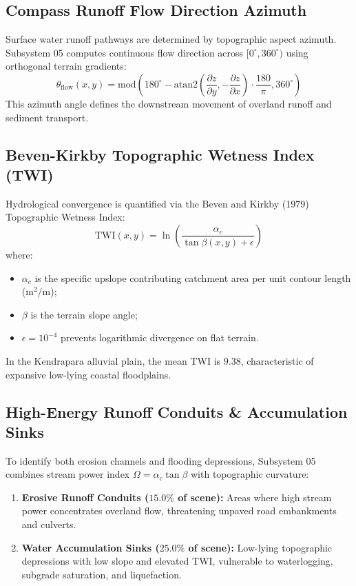 \documentclass[11pt,a4paper]{article}
\theoremstyle{definition}
\theoremstyle{remark}
\begin{document}
\subsection{Compass Runoff Flow Direction Azimuth}
Surface water runoff pathways are determined by topographic aspect azimuth. Subsystem 05 computes continuous flow direction across $[0^\circ, 360^\circ)$ using orthogonal terrain gradients:
\begin{equation}
    \theta_{\text{flow}}(x, y) = \text{mod}\left( 180^\circ - \text{atan2}\left( \frac{\partial z}{\partial y}, -\frac{\partial z}{\partial x} \right) \cdot \frac{180}{\pi}, 360^\circ \right)
\end{equation}
This azimuth angle defines the downstream movement of overland runoff and sediment transport.

\subsection{Beven-Kirkby Topographic Wetness Index (TWI)}
Hydrological convergence is quantified via the Beven and Kirkby (1979) Topographic Wetness Index:
\begin{equation}
    \text{TWI}(x, y) = \ln\left( \frac{\alpha_c}{\tan \beta(x, y) + \epsilon} \right)
\end{equation}
\noindent where:
\begin{itemize}
    \item $\alpha_c$ is the specific upslope contributing catchment area per unit contour length ($\text{m}^2/\text{m}$);
    \item $\beta$ is the terrain slope angle;
    \item $\epsilon = 10^{-4}$ prevents logarithmic divergence on flat terrain.
\end{itemize}
In the Kendrapara alluvial plain, the mean TWI is $9.38$, characteristic of expansive low-lying coastal floodplains.

\subsection{High-Energy Runoff Conduits \& Accumulation Sinks}
To identify both erosion channels and flooding depressions, Subsystem 05 combines stream power index $\Omega = \alpha_c \tan \beta$ with topographic curvature:
\begin{enumerate}
    \item \textbf{Erosive Runoff Conduits ($15.0\%$ of scene):} Areas where high stream power concentrates overland flow, threatening unpaved road embankments and culverts.
    \item \textbf{Water Accumulation Sinks ($25.0\%$ of scene):} Low-lying topographic depressions with low slope and elevated TWI, vulnerable to waterlogging, subgrade saturation, and liquefaction.
\end{enumerate}
\end{document}

